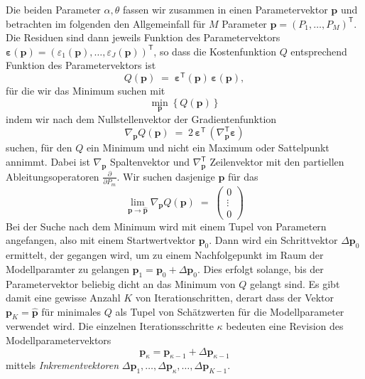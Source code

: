 Die beiden Parameter $\alpha,\theta$ fassen wir zusammen in einen Parametervektor $\mathbf{p}$ und
betrachten im folgenden den Allgemeinfall für $M$ Parameter $\mathbf{p} = (P_1,\dots,P_M)^\mathsf{T}$.
Die Residuen sind dann jeweils Funktion des Parametervektors
$\boldsymbol \varepsilon(\mathbf{p}) = (\varepsilon_1(\mathbf{p}), \dots, \varepsilon_J(\mathbf{p}))^\mathsf{T}$,
so dass die Kostenfunktion $Q$ entsprechend Funktion des Parametervektors ist
\begin{equation}
Q(\mathbf{p}) \; = \; \boldsymbol \varepsilon^\mathsf{T}(\mathbf{p}) \, \boldsymbol \varepsilon(\mathbf{p}),
\label{Zielfunktional}
\end{equation}
für die wir das Minimum suchen mit
\begin{equation}
\min_{\mathbf{p}} \left\{ Q(\mathbf{p}) \right\}
\end{equation}
indem wir nach dem Nullstellenvektor der Gradientenfunktion
\begin{equation}
\nabla_{\mathbf{p}} Q(\mathbf{p}) \; = \;
 2 \, \boldsymbol \varepsilon^\mathsf{T} \, \left( \nabla_{\mathbf{p}}^\mathsf{T} \boldsymbol \varepsilon \right)
\label{ZielfunktionalGrad}
\end{equation}
suchen, für den $Q$ ein Minimum und nicht ein Maximum oder Sattelpunkt annimmt.
Dabei ist $\nabla_{\mathbf{p}}$ Spaltenvektor und $\nabla_{\mathbf{p}}^\mathsf{T}$ Zeilenvektor
mit den partiellen Ableitungsoperatoren $\frac{\partial}{\partial P_m}$.
Wir suchen dasjenige $\mathbf{p}$ für das
\begin{equation}
\lim_{\mathbf{p} \rightarrow \mathbf{\hat p}}
\nabla_{\mathbf{p}} Q(\mathbf{p}) \; = \; \left(\begin{array}{c} 0\\ \vdots \\ 0 \end{array}\right)
\label{ZielfunktionalGrad1}
\end{equation}
Bei der Suche nach dem Minimum wird mit einem Tupel von Parametern angefangen, also
mit einem Startwertvektor $\mathbf{p}_0$. Dann wird ein Schrittvektor $\Delta \mathbf{p}_0$ ermittelt,
der gegangen wird, um
zu einem Nachfolgepunkt im Raum der Modellparamter zu gelangen $\mathbf{p}_1 = \mathbf{p}_0 + \Delta \mathbf{p}_0$.
Dies erfolgt solange, bis der Parametervektor beliebig dicht an das Minimum von $Q$ gelangt sind. Es gibt damit eine
gewisse Anzahl $K$ von Iterationschritten, derart dass der Vektor $\mathbf{p}_K = \mathbf{\hat p}$ für minimales
$Q$ als Tupel von Schätzwerten für die Modellparameter verwendet wird.
Die einzelnen Iterationsschritte $\kappa$ bedeuten eine Revision des Modellparametervektors
\begin{equation}
\mathbf{p}_\kappa = \mathbf{p}_{\kappa-1} + \Delta \mathbf{p}_{\kappa-1}
\label{Revisionsschritt}
\end{equation}
mittels \textsl{Inkrementvektoren}
$\Delta \mathbf{p}_1, \dots, \Delta \mathbf{p}_{\kappa}, \dots, \Delta \mathbf{p}_{K-1}$.

